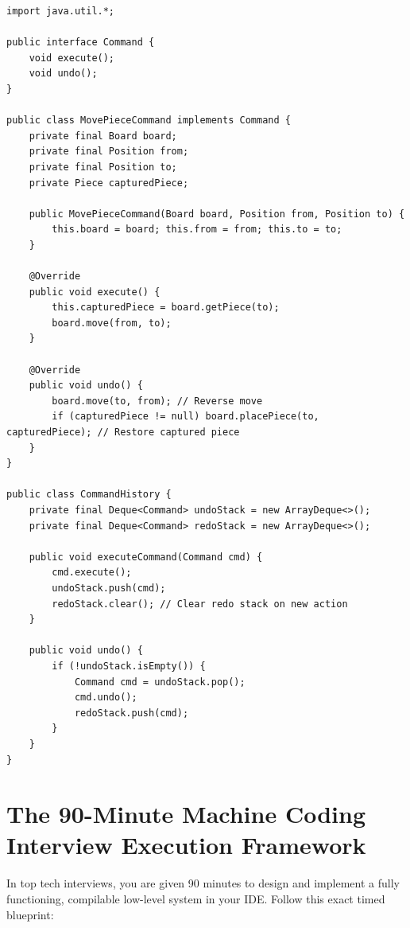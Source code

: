 \documentclass[10pt,journal,compsoc,onecolumn]{IEEEtran}
\begin{document}
\begin{verbatim}
import java.util.*;

public interface Command {
    void execute();
    void undo();
}

public class MovePieceCommand implements Command {
    private final Board board;
    private final Position from;
    private final Position to;
    private Piece capturedPiece;

    public MovePieceCommand(Board board, Position from, Position to) {
        this.board = board; this.from = from; this.to = to;
    }

    @Override
    public void execute() {
        this.capturedPiece = board.getPiece(to);
        board.move(from, to);
    }

    @Override
    public void undo() {
        board.move(to, from); // Reverse move
        if (capturedPiece != null) board.placePiece(to, capturedPiece); // Restore captured piece
    }
}

public class CommandHistory {
    private final Deque<Command> undoStack = new ArrayDeque<>();
    private final Deque<Command> redoStack = new ArrayDeque<>();

    public void executeCommand(Command cmd) {
        cmd.execute();
        undoStack.push(cmd);
        redoStack.clear(); // Clear redo stack on new action
    }

    public void undo() {
        if (!undoStack.isEmpty()) {
            Command cmd = undoStack.pop();
            cmd.undo();
            redoStack.push(cmd);
        }
    }
}
\end{verbatim}

\section{The 90-Minute Machine Coding Interview Execution Framework}
\label{sec:framework}

In top tech interviews, you are given 90 minutes to design and implement a fully functioning, compilable low-level system in your IDE. Follow this exact timed blueprint:
\end{document}
